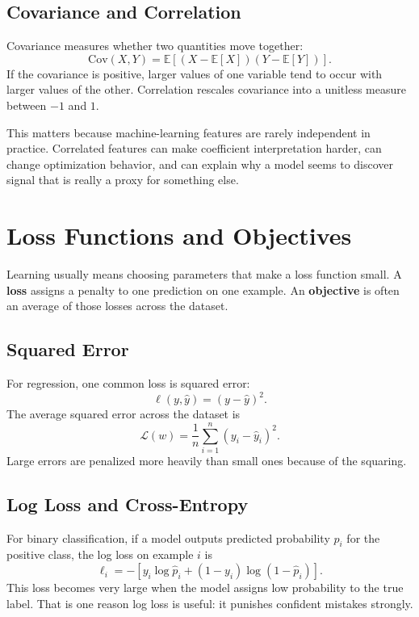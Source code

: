 \subsection{Covariance and Correlation}

Covariance measures whether two quantities move together:
\[
\mathrm{Cov}(X,Y) = \mathbb{E}\left[(X-\mathbb{E}[X])(Y-\mathbb{E}[Y])\right].
\]
If the covariance is positive, larger values of one variable tend to occur with larger values of the other. Correlation rescales covariance into a unitless measure between $-1$ and $1$.

This matters because machine-learning features are rarely independent in practice. Correlated features can make coefficient interpretation harder, can change optimization behavior, and can explain why a model seems to discover signal that is really a proxy for something else.

\section{Loss Functions and Objectives}

Learning usually means choosing parameters that make a loss function small. A \textbf{loss} assigns a penalty to one prediction on one example. An \textbf{objective} is often an average of those losses across the dataset.

\subsection{Squared Error}

For regression, one common loss is squared error:
\[
\ell(y,\hat{y}) = (y-\hat{y})^2.
\]
The average squared error across the dataset is
\[
\mathcal{L}(w) = \frac{1}{n}\sum_{i=1}^{n}(y_i - \hat{y}_i)^2.
\]
Large errors are penalized more heavily than small ones because of the squaring.

\subsection{Log Loss and Cross-Entropy}

For binary classification, if a model outputs predicted probability $\hat{p}_i$ for the positive class, the log loss on example $i$ is
\[
\ell_i = -\left[y_i \log \hat{p}_i + (1-y_i)\log(1-\hat{p}_i)\right].
\]
This loss becomes very large when the model assigns low probability to the true label. That is one reason log loss is useful: it punishes confident mistakes strongly.

